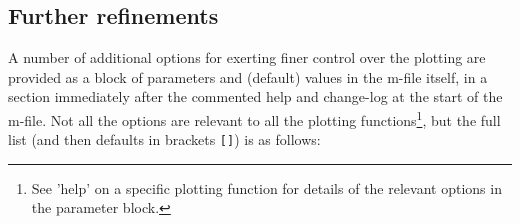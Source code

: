 \documentclass[11pt,fleqn]{book} %
\begin{document}

\subsection{Further refinements}

A number of additional options for exerting finer control over the plotting are provided as a block of parameters and (default) values in the m-file itself, in a section immediately after the commented help and change-log at the start of the m-file. Not all the options are relevant to all the plotting functions\footnote{See 'help' on a specific plotting function for details of the relevant options in the parameter block.}, but the full list (and then defaults in brackets \texttt{[]}) is as follows:
\end{document}
